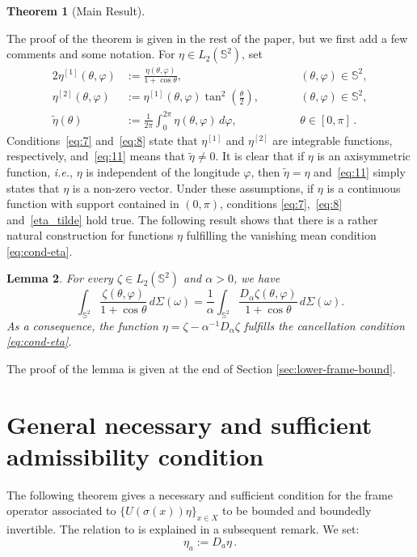 \documentclass[a4paper,11pt,DIV=11,%
abstract=on%
]{scrartcl}
\newtheorem{thm}{Theorem}[section]
\newtheorem{lemma}[thm]{Lemma}
\newcommand{\blue}[1]{#1}
\begin{document}
{\begin{thm}[Main Result]
\end{thm}
The proof of the theorem is given in the rest of the paper, but
  we  first add a few comments and  some notation. For $\eta\in
  L_2(\mathbb S^2)$, set 
  \begin{alignat}{2}
   \eta^{[1]}(\theta ,\varphi) & := \frac{\eta(\theta , \varphi)}{1 +
     \cos\theta}, \quad &&\quad	(\theta,\varphi)\in \mathbb
   S^2, \label{def:eta-prime}\\ 
	\eta^{[2]}(\theta ,\varphi) & := \eta^{[1]}(\theta
        ,\varphi)\tan^2(\tfrac\theta2), \quad && \quad 
	(\theta,\varphi)\in \mathbb S^2, \label{def:eta-second}\\
      \widetilde\eta(\theta)
      &:=\frac{1}{2\pi}\int_0^{2\pi}\eta(\theta,\varphi)\,d\varphi,
      \quad&&\quad \theta\in[0,\pi]\,.  \label{def:eta-tilde}
    \end{alignat}
Conditions~\eqref{eq:7} and~\eqref{eq:8} state that $ \eta^{[1]}$ and
$ \eta^{[2]}$ are integrable functions, respectively,
and~\eqref{eq:11} means that $\widetilde\eta\neq 0$.  It is
clear that if $\eta$ is an axisymmetric function,
\emph{i.e.}, $\eta$ is independent of  the longitude $\varphi$, then
$\widetilde\eta=\eta$ and~\eqref{eq:11} simply states that $\eta$ is a
non-zero vector. Under these
assumptions,  if $\eta$ is a continuous function with support contained
in $(0,\pi)$, conditions \eqref{eq:7},~\eqref{eq:8}
and~\eqref{eta_tilde} hold true. \blue{The following result shows that there is
a rather natural construction for functions $\eta$ fulfilling the
vanishing mean condition \eqref{eq:cond-eta}.} }

\begin{lemma}\label{exist:eta}
	For every $\zeta\in L_2(\mathbb S^2)$ and $\alpha>0$, we have
	$$\int_{\mathbb S^2}\frac{\zeta(\theta,\varphi)}{1+\cos\theta}\,d\Sigma(\omega)
	=\frac1\alpha\int_{\mathbb S^2}\frac{D_\alpha\zeta(\theta,\varphi)}{1+\cos\theta}\,d\Sigma(\omega).$$
	As a consequence, the function
        $\eta=\zeta-\alpha^{-1}D_\alpha\zeta$ fulfills the
        cancellation condition 
	\eqref{eq:cond-eta}.  
\end{lemma}

The proof of the lemma is given at the end of  Section \ref{sec:lower-frame-bound}.



\section{General necessary and sufficient admissibility condition} \label{sec:nec-suff-condition-for-admissibilty}\label{NSconditions}
The following theorem gives a necessary and sufficient condition 
for the frame operator associated to $\{U(\sigma(x))\eta\}_{x\in X}$ 
to be bounded and boundedly invertible. The relation to \cite[Theorem 3.3]{AV99} is explained in a subsequent remark.
We set:
$$\eta_a := D_a \eta\, .$$
\end{document}
